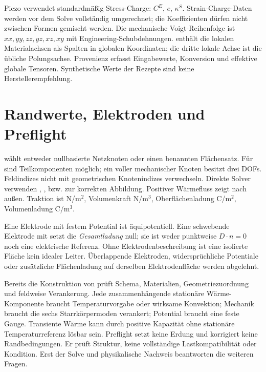 Piezo verwendet standardmäßig Stress-Charge: $C^E$, $e$, $\kappa^S$.
Strain-Charge-Daten werden vor dem Solve vollständig umgerechnet; die
Koeffizienten dürfen nicht zwischen Formen gemischt werden. Die mechanische
Voigt-Reihenfolge ist $xx,yy,zz,yz,xz,xy$ mit Engineering-Schubdehnungen.
 enthält die lokalen Materialachsen als Spalten in globalen
Koordinaten; die dritte lokale Achse ist die übliche Polungsachse.
Provenienz erfasst Eingabewerte, Konversion und effektive globale Tensoren.
Synthetische Werte der Rezepte sind keine Herstellerempfehlung.

\section{Randwerte, Elektroden und Preflight}
 wählt entweder nullbasierte Netzknoten oder einen
benannten Flächensatz. Für  sind Teilkomponenten 
möglich; ein voller mechanischer Knoten besitzt drei DOFs. Feldindizes
nicht mit geometrischen Knotenindizes verwechseln. Direkte Solver verwenden
, ,  bzw.
 zur korrekten Abbildung.
Positiver Wärmefluss zeigt nach außen. Traktion ist N/m$^2$, Volumenkraft
N/m$^3$, Oberflächenladung C/m$^2$, Volumenladung C/m$^3$.

Eine Elektrode mit festem Potential ist äquipotentiell. Eine schwebende
Elektrode mit  setzt die \emph{Gesamtladung} null;
sie ist weder punktweise $D\cdot n=0$ noch eine elektrische Referenz.
Ohne Elektrodenbeschreibung ist eine isolierte Fläche kein idealer Leiter.
Überlappende Elektroden, widersprüchliche Potentiale oder zusätzliche
Flächenladung auf derselben Elektrodenfläche werden abgelehnt.

Bereits die Konstruktion von  prüft Schema, Materialien,
Geometriezuordnung und feldweise Verankerung. Jede zusammenhängende
stationäre Wärme-Komponente braucht Temperaturvorgabe oder wirksame
Konvektion; Mechanik braucht die sechs Starrkörpermoden verankert;
Potential braucht eine feste Gauge. Transiente Wärme kann durch positive
Kapazität ohne stationäre Temperaturreferenz lösbar sein. Preflight setzt
keine Erdung und korrigiert keine Randbedingungen. Er prüft Struktur,
keine vollständige Lastkompatibilität oder Kondition. Erst der Solve und
physikalische Nachweis beantworten die weiteren Fragen.
